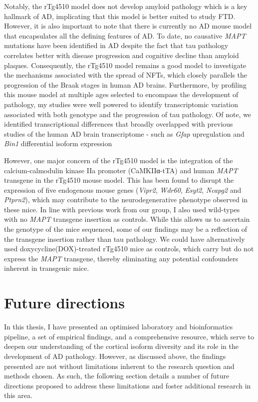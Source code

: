 Notably, the rTg4510 model does not develop amyloid pathology which is a key hallmark of AD, implicating that this model is better suited to study FTD. However, it is also important to note that there is currently no AD mouse model that encapsulates all the defining features of AD. To date, no causative \textit{MAPT} mutations have been identified in AD despite the fact that tau pathology correlates better with disease progression and cognitive decline than amyloid plaques\cite{Serrano-Pozo2016,Giannakopoulos2003,PV1992}. Consequently, the rTg4510 model remains a good model to investigate the mechanisms associated with the spread of NFTs, which closely parallels the progression of the Braak stages in human AD brains. Furthermore, by profiling this mouse model at multiple ages selected to encompass the development of pathology, my studies were well powered to identify transcriptomic variation associated with both genotype and the progression of tau pathology. Of note, we identified transcriptional differences that broadly overlapped with previous studies of the human AD brain transcriptome - such as \textit{Gfap} upregulation and \textit{Bin1} differential isoform expression

However, one major concern of the rTg4510 model is the integration of the calcium-calmodulin kinase IIa promoter (CaMKIIα-tTA) and human \textit{MAPT} transgene in the rTg4510 mouse model. This has been found to disrupt the expression of five endogenous mouse genes (\textit{Vipr2}, \textit{Wdr60}, \textit{Esyt2}, \textit{Ncapg2} and \textit{Ptprn2}), which may contribute to the neurodegenerative phenotype observed in these mice\cite{Castanho2020,Gamache2019}. In line with previous work from our group\cite{Castanho2020}, I also used wild-types with no \textit{MAPT} transgene insertion as controls. While this allows us to ascertain the genotype of the mice sequenced, some of our findings may be a reflection of the transgene insertion rather than tau pathology. We could have alternatively used doxycycline(DOX)-treated rTg4510 mice as controls, which carry but do not express the \textit{MAPT} transgene, thereby eliminating any potential confounders inherent in transgenic mice. 
 
	
\section{Future directions}
In this thesis, I have presented an optimised laboratory and bioinformatics pipeline, a set of empirical findings, and a comprehensive resource, which serve to deepen our understanding of the cortical isoform diversity and its role in the development of AD pathology. However, as discussed above, the findings presented are not without limitations inherent to the research question and methods chosen. As such, the following section details a number of future directions proposed to address these limitations and foster additional research in this area.   

